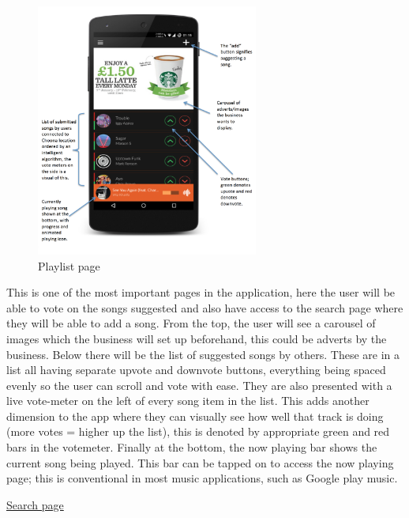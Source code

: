 \noindent
\begin{figure}[h!]
\centering
\includegraphics[width=0.65\textwidth]{./img/playlistannotated.png}
\caption{Playlist page}
\label{fig:playlist}
\end{figure}

This is one of the most important pages in the application, here the user will be able to vote on the songs suggested and also have access to the search page where they will be able to add a song. From the top, the user will see a carousel of images which the business will set up beforehand, this could be adverts by the business. Below there will be the list of suggested songs by others. These are in a list all having separate upvote and downvote buttons, everything being spaced evenly so the user can scroll and vote with ease. They are also presented with a live vote-meter on the left of every song item in the list. This adds another dimension to the app where they can visually see how well that track is doing (more votes = higher up the list), this is denoted by appropriate green and red bars in the votemeter. Finally at the bottom, the now playing bar shows the current song being played. This bar can be tapped on to access the now playing page; this is conventional in most music applications, such as Google play music.

\clearpage


\noindent\underline{Search page}\newline

